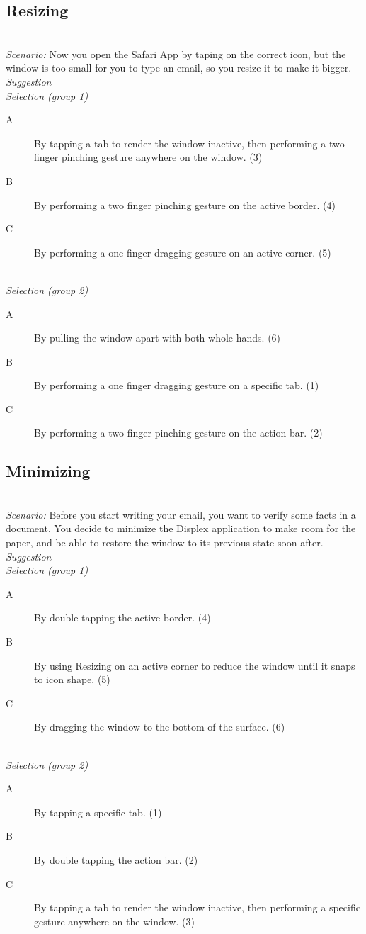 \subsection{Resizing}
\hfill\\
\emph{Scenario:}
Now you open the Safari App by taping on the correct icon, but the window is too small for you to type an email, so you resize it to make it bigger.
\hfill\\
\emph{Suggestion}
\hfill\\
\emph{Selection (group 1)}
\begin{description}
\item[A]{By tapping a tab to render the window inactive, then performing a two finger pinching gesture anywhere on the window. (3)}
\item[B]{By performing a two finger pinching gesture on the active border. (4)}
\item[C]{By performing a one finger dragging gesture on an active corner. (5)}
\end{description}
\hfill\\
\emph{Selection (group 2)}
\begin{description}
\item[A]{By pulling the window apart with both whole hands. (6)}
\item[B]{By performing a one finger dragging gesture on a specific tab. (1)}
\item[C]{By performing a two finger pinching gesture on the action bar. (2)}
\end{description}



\subsection{Minimizing}
\hfill\\
\emph{Scenario:}
Before you start writing your email, you want to verify some facts in a document.
You decide to minimize the Displex application to make room for the paper, and be able to restore the window to its previous state soon after.
\hfill\\
\emph{Suggestion}
\hfill\\
\emph{Selection (group 1)}
\begin{description}
\item[A]{By double tapping the active border. (4)}
\item[B]{By using Resizing on an active corner to reduce the window until it snaps to icon shape. (5)}
\item[C]{By dragging the window to the bottom of the surface. (6)}
\end{description}
\hfill\\
\emph{Selection (group 2)}
\begin{description}
\item[A]{By tapping a specific tab. (1)}
\item[B]{By double tapping the action bar. (2)}
\item[C]{By tapping a tab to render the window inactive, then performing a specific gesture anywhere on the window. (3)}
\end{description}

